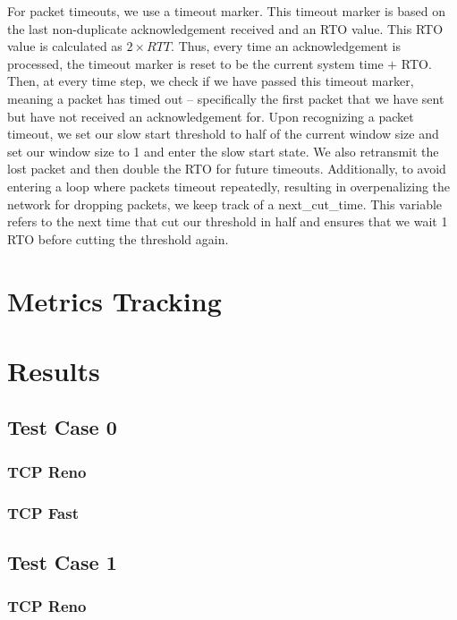 \documentclass{article}
\begin{document}
For packet timeouts, we use a timeout marker. This timeout marker is based on the last non-duplicate acknowledgement received and an RTO value. This RTO value is calculated as $2 \times RTT$. Thus, every time an acknowledgement is processed, the timeout marker is reset to be the current system time $+$ RTO. Then, at every time step, we check if we have passed this timeout marker, meaning a packet has timed out -- specifically the first packet that we have sent but have not received an acknowledgement for. Upon recognizing a packet timeout, we set our slow start threshold to half of the current window size and set our window size to 1 and enter the slow start state. We also retransmit the lost packet and then double the RTO for future timeouts. Additionally, to avoid entering a loop where packets timeout repeatedly, resulting in overpenalizing the network for dropping packets, we keep track of a next\_cut\_time. This variable refers to the next time that cut our threshold in half and ensures that we wait 1 RTO before cutting the threshold again. 

\section{Metrics Tracking}

\section{Results}

\subsection{Test Case 0}

\subsubsection{TCP Reno}

\subsubsection{TCP Fast}

\subsection{Test Case 1}

\subsubsection{TCP Reno}
\end{document}
